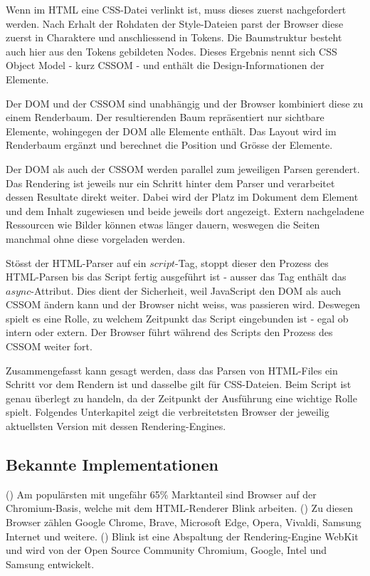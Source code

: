 Wenn im HTML eine CSS-Datei verlinkt ist, muss dieses zuerst nachgefordert werden.
Nach Erhalt der Rohdaten der Style-Dateien parst der Browser diese zuerst in Charaktere und anschliessend in Tokens.
Die Baumstruktur besteht auch hier aus den Tokens gebildeten Nodes. 
Dieses Ergebnis nennt sich CSS Object Model - kurz CSSOM - und enthält die Design-Informationen der Elemente.

Der DOM und der CSSOM sind unabhängig und der Browser kombiniert diese zu einem Renderbaum.
Der resultierenden Baum repräsentiert nur sichtbare Elemente, wohingegen der DOM alle Elemente enthält.
Das Layout wird im Renderbaum ergänzt und berechnet die Position und Grösse der Elemente.

Der DOM als auch der CSSOM werden parallel zum jeweiligen Parsen gerendert.
Das Rendering ist jeweils nur ein Schritt hinter dem Parser und verarbeitet dessen Resultate direkt weiter.
Dabei wird der Platz im Dokument dem Element und dem Inhalt zugewiesen und beide jeweils dort angezeigt. %
Extern nachgeladene Ressourcen wie Bilder können etwas länger dauern, weswegen die Seiten manchmal ohne diese vorgeladen werden.

Stösst der HTML-Parser auf ein $script$-Tag, stoppt dieser den Prozess des HTML-Parsen bis das Script fertig ausgeführt ist - ausser das Tag enthält das $async$-Attribut.
Dies dient der Sicherheit, weil JavaScript den DOM als auch CSSOM ändern kann und der Browser nicht weiss, was passieren wird.
Deswegen spielt es eine Rolle, zu welchem Zeitpunkt das Script eingebunden ist - egal ob intern oder extern. 
Der Browser führt während des Scripts den Prozess des CSSOM weiter fort.

Zusammengefasst kann gesagt werden, dass das Parsen von HTML-Files ein Schritt vor dem Rendern ist und dasselbe gilt für CSS-Dateien. 
Beim Script ist genau überlegt zu handeln, da der Zeitpunkt der Ausführung eine wichtige Rolle spielt.
Folgendes Unterkapitel zeigt die verbreitetsten Browser der jeweilig aktuellsten Version mit dessen Rendering-Engines.


\subsection{Bekannte Implementationen}

(\cite{blinkRenderer}) Am populärsten mit ungefähr 65\% Marktanteil sind Browser auf der Chromium-Basis, welche mit dem HTML-Renderer Blink arbeiten. 
(\cite{chromiumBrowser}) Zu diesen Browser zählen Google Chrome, Brave, Microsoft Edge, Opera, Vivaldi, Samsung Internet und weitere.
(\cite{blinkRenderer}) Blink ist eine Abspaltung der Rendering-Engine WebKit und wird von der Open Source Community Chromium, Google, Intel und Samsung entwickelt.

